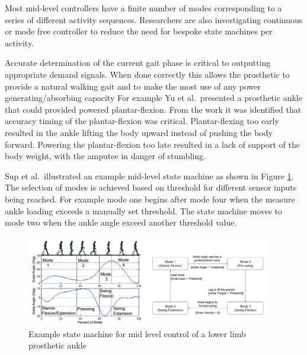 Most mid-level controllers have a finite number of modes corresponding to a series of different activity sequences. Researchers are also investigating continuous or mode free controller to reduce the need for bespoke state machines per activity.\cite{Rai2019b, Bartlett2021}

Accurate determination of the current gait phase is critical to outputting appropriate demand signals. When done correctly this allows the prosthetic to provide a natural walking gait and to make the most use of any power generating/absorbing capacity
For example Yu et al.~presented a prosthetic ankle that could provided powered plantar-flexion. From the work it was identified that accuracy timing of the plantar-flexion was critical. Plantar-flexing  too early resulted in the ankle lifting the body upward instead of pushing the body forward. Powering the plantar-flexion too late resulted in a lack of support of the body weight, with the amputee in danger of stumbling.\cite{Yu2019}

Sup et al.~illustrated an example mid-level state machine as shown in Figure \ref{fig:mid-level-state-machine}. The selection of modes is achieved based on threshold for different sensor inputs being reached. For example mode one begins after mode four when the measure ankle loading exceeds a manually set threshold. The state machine moves to mode two when the ankle angle exceed another threshold value.\cite{Sup2008b}

\begin{figure}[!hbt]
    \centering
    \includegraphics[width=0.95\textwidth]{content/2-Background/state_machine_based_mid_level_controller.png}
    \caption[Example state machine for mid level control of a lower limb prosthetic ankle]{Example state machine for mid level control of a lower limb prosthetic ankle \cite{Sup2008b}}
    \label{fig:mid-level-state-machine}
\end{figure}

